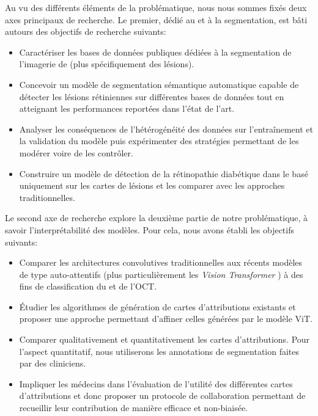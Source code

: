Au vu des différents éléments de la problématique, nous nous sommes fixés deux axes principaux de recherche. Le premier, dédié au \fundus{} et à la segmentation, est bâti autours des objectifs de recherche suivants:
\begin{itemize}
	\item Caractériser les bases de données publiques dédiées à la segmentation de l'imagerie de \fundus{} (plus spécifiquement des lésions).
	\item Concevoir un modèle de segmentation sémantique automatique capable de détecter les lésions rétiniennes sur différentes bases de données tout en atteignant les performances reportées dans l'état de l'art.
	\item Analyser les conséquences de l'hétérogénéité des données sur l'entraînement et la validation du modèle puis expérimenter des stratégies permettant de les modérer voire de les contrôler.	
	\item Construire un modèle de détection de la rétinopathie diabétique dans le \fundus{} basé uniquement sur les cartes de lésions et les comparer avec les approches traditionnelles.
\end{itemize}
Le second axe de recherche explore la deuxième partie de notre problématique, à savoir l'interprétabilité des modèles. Pour cela, nous avons établi les objectifs suivants:
\begin{itemize}
	\item Comparer les architectures convolutives traditionnelles aux récents modèles de type auto-attentifs (plus particulièrement les \textit{Vision Transformer} \cite{dosovitskiyImageWorth16x162020}) à des fins de classification du \fundus{} et de l'OCT. 
	\item Étudier les algorithmes de génération de cartes d'attributions existants et proposer une approche permettant d'affiner celles générées par le modèle ViT.
	\item Comparer qualitativement et quantitativement les cartes d'attributions. Pour l'aspect quantitatif, nous utiliserons les annotations de segmentation faites par des cliniciens.
	\item Impliquer les médecins dans l'évaluation de l'utilité des différentes cartes d'attributions et donc proposer un protocole de collaboration permettant de recueillir leur contribution de manière efficace et non-biaisée.
\end{itemize}
